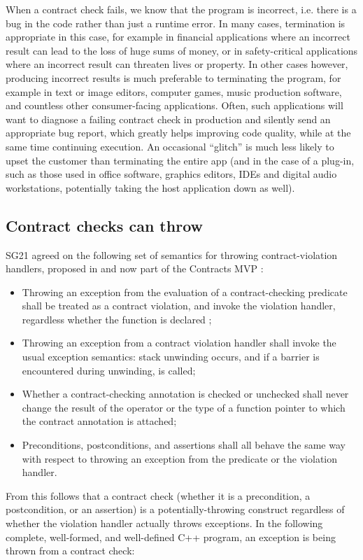 When a contract check fails, we know that the program is incorrect, i.e. there is a bug in the code rather than just a runtime error. In many cases, termination is appropriate in this case, for example in financial applications where an incorrect result can lead to the loss of huge sums of money, or in safety-critical applications where an incorrect result can threaten lives or property. In other cases however, producing incorrect results is much preferable to terminating the program, for example in text or image editors, computer games, music production software, and countless other consumer-facing applications. Often, such applications will want to diagnose a failing contract check in production and silently send an appropriate bug report, which greatly helps improving code quality, while at the same time continuing execution. An occasional ``glitch'' is much less likely to upset the customer than terminating the entire app (and in the case of a plug-in, such as those used in office software, graphics editors, IDEs and digital audio workstations, potentially taking the host application down as well).

\subsection{Contract checks can throw}

SG21 agreed on the following set of semantics for throwing contract-violation handlers, proposed in \cite{P2811R7} and now part of the Contracts MVP \cite{P2900R1}:
\begin{itemize}
\item Throwing an exception from the evaluation of a contract-checking predicate shall be treated as a contract violation, and invoke the violation handler, regardless whether the function is declared ;
\item Throwing an exception from a contract violation handler shall invoke the usual exception semantics: stack unwinding occurs, and if a  barrier is encountered during unwinding,  is called;
\item Whether a contract-checking annotation is checked or unchecked shall never change the result of the  operator or the type of a function pointer to which the contract annotation is attached;
\item Preconditions, postconditions, and assertions shall all behave the same way with respect to throwing an exception from the predicate or the violation handler.
\end{itemize}
From this follows that a contract check (whether it is a precondition, a postcondition, or an assertion) is a potentially-throwing construct regardless of whether the violation handler actually throws exceptions. In the following complete, well-formed, and well-defined C++ program, an exception is being thrown from a contract check:

